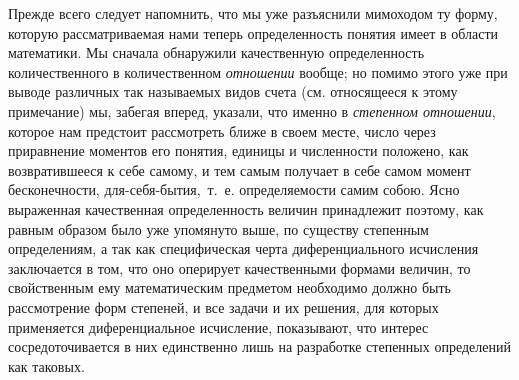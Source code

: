 {Прежде всего следует напомнить, что мы уже разъяснили мимоходом ту форму,
которую рассматриваемая нами теперь определенность понятия имеет в области
математики. Мы сначала обнаружили качественную определенность
количественного в количественном {\em отношении}
вообще; но помимо этого уже при выводе различных так называемых видов счета
(см. относящееся к этому примечание) мы, забегая вперед, указали, что
именно в {\em степенном отношении}, которое нам
предстоит рассмотреть ближе в своем месте, число через приравнение моментов
его понятия, единицы и численности положено, как возвратившееся к себе
самому, и тем самым получает в себе самом момент бесконечности,
для-себя-бытия,~т.~е. определяемости самим собою. Ясно выраженная
качественная определенность величин принадлежит поэтому, как равным образом
было уже упомянуто выше, по существу степенным определениям, а так как
специфическая черта диференциального исчисления заключается в том, что оно
оперирует качественными формами величин, то свойственным ему математическим
предметом необходимо должно быть рассмотрение форм степеней, и все задачи и
их решения, для которых применяется диференциальное исчисление, показывают,
что интерес сосредоточивается в них единственно лишь на разработке
степенных определений как таковых.

}
